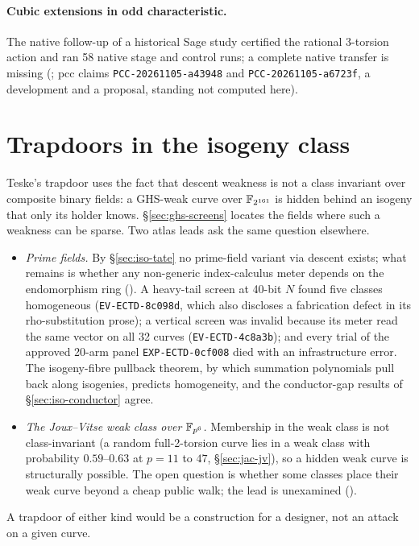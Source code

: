 \paragraph{Cubic extensions in odd characteristic.} The native follow-up of
a historical Sage study certified the rational 3-torsion action and ran 58 native stage and
control runs; a complete native transfer is missing
(; pcc claims
\texttt{PCC-20261105-a43948} and \texttt{PCC-20261105-a6723f}, a development
and a proposal, standing not computed here).

\section{Trapdoors in the isogeny class}\label{sec:ghs-teske}

Teske's trapdoor uses the fact that descent weakness is not a class
invariant over composite binary fields: a GHS-weak curve over
$\mathbb{F}_{2^{161}}$ is hidden behind an isogeny that only its holder knows.
\S\ref{sec:ghs-screens} locates the fields where such a weakness can be sparse.
Two atlas leads ask the same question elsewhere.
\begin{itemize}
\item \emph{Prime fields.} By \S\ref{sec:iso-tate} no prime-field variant via
  descent exists; what remains is whether any non-generic index-calculus
  meter depends on the endomorphism ring
  ().
  A heavy-tail screen at 40-bit $N$ found five classes homogeneous
  (\texttt{EV-ECTD-8c098d}, which also discloses a fabrication defect in
  its rho-substitution prose); a vertical screen was invalid because its
  meter read the same vector on all 32 curves (\texttt{EV-ECTD-4c8a3b}); and
  every trial of the approved 20-arm panel \texttt{EXP-ECTD-0cf008} died with
  an infrastructure error. The isogeny-fibre pullback theorem, by which
  summation polynomials pull back along isogenies, predicts homogeneity,
  and the conductor-gap results of \S\ref{sec:iso-conductor} agree.
\item \emph{The Joux--Vitse weak class over $\mathbb{F}_{p^6}$.} Membership in the
  weak class is not class-invariant (a random full-2-torsion curve lies in a
  weak class with probability $0.59$--$0.63$ at $p=11$ to $47$, \S\ref{sec:jac-jv}), so a hidden weak curve is structurally possible. The
  open question is whether some classes place their weak curve beyond a
  cheap public walk; the lead is unexamined
  ().
\end{itemize}
A trapdoor of either kind would be a construction for a designer, not an
attack on a given curve.

